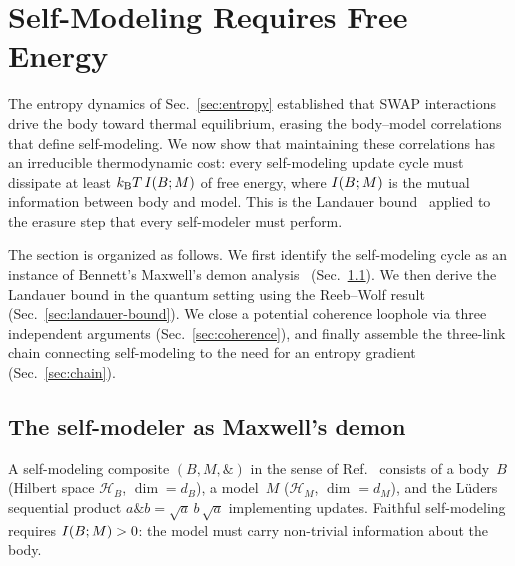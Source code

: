 
\section{Self-Modeling Requires Free Energy}\label{sec:landauer}

The entropy dynamics of Sec.~\ref{sec:entropy} established that
SWAP interactions drive the body toward thermal equilibrium, erasing
the body--model correlations that define self-modeling.  We now show
that maintaining these correlations has an irreducible thermodynamic
cost: every self-modeling update cycle must dissipate at least
$k_{\mathrm{B}} T\,I(B;M)$ of free energy, where $I(B;M)$ is the mutual
information between body and model.  This is the Landauer
bound~\cite{Landauer1961} applied to the erasure step that every
self-modeler must perform.

The section is organized as follows.  We first identify the
self-modeling cycle as an instance of Bennett's Maxwell's demon
analysis~\cite{Bennett1982} (Sec.~\ref{sec:demon}).  We then derive
the Landauer bound in the quantum setting using the Reeb--Wolf
result~\cite{ReebWolf2014} (Sec.~\ref{sec:landauer-bound}).  We
close a potential coherence loophole via three independent arguments
(Sec.~\ref{sec:coherence}), and finally assemble the three-link
chain connecting self-modeling to the need for an entropy gradient
(Sec.~\ref{sec:chain}).

\subsection{The self-modeler as Maxwell's demon}
\label{sec:demon}

A self-modeling composite $(B,M,\mathbin{\&})$ in the sense of
Ref.~\cite{Paper5} consists of a body~$B$ (Hilbert space
$\mathcal{H}_B$, $\dim = d_B$), a model~$M$ ($\mathcal{H}_M$,
$\dim = d_M$), and the Lüders sequential product
$a \mathbin{\&} b = \sqrt{a}\,b\,\sqrt{a}$ implementing updates.
Faithful self-modeling requires $I(B;M) > 0$: the model must
carry non-trivial information about the body.

